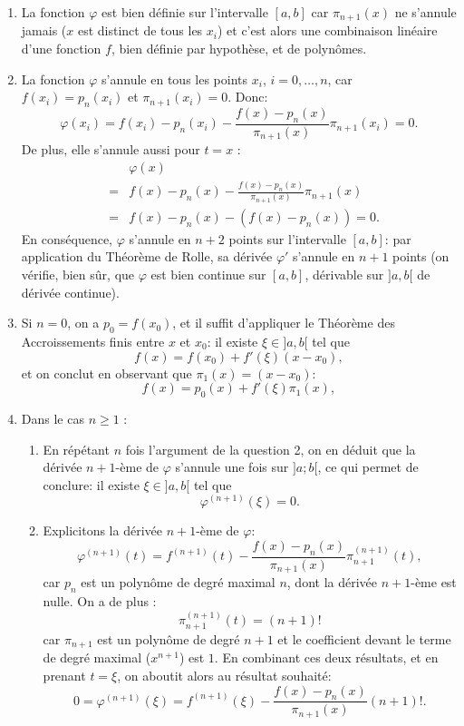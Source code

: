 \documentclass{article}
\begin{document}
\begin{enumerate}
    \item La fonction $\varphi$ est bien définie sur l'intervalle $[a,b]$ car $\pi_{n+1}(x)$ ne s'annule jamais ($x$ est distinct de tous les $x_i$) et c'est alors une combinaison linéaire d'une fonction $f$, bien définie par hypothèse, et de polynômes.
    
    \item La fonction $\varphi$ s'annule en tous les points $x_i$, $i=0,\ldots,n$, car $f(x_i)=p_n(x_i)$ et $\pi_{n+1}(x_i) = 0$. Donc:
    \[
    \varphi(x_i) = f(x_i) - p_n(x_i) - \frac{f(x)-p_n(x)}{\pi_{n+1}(x)} \pi_{n+1} (x_i) = 0.
    \]
    De plus, elle s'annule aussi pour $t=x$ :
    \begin{eqnarray*}
    && \varphi(x) \\&=& f(x) - p_n(x) - \frac{f(x)-p_n(x)}{\pi_{n+1}(x)} \pi_{n+1} (x)\\
    &=& f(x) - p_n(x) - ( f(x) - p_n(x) ) = 0.
    \end{eqnarray*}
    En conséquence, $\varphi$ s'annule en $n+2$ points sur l'intervalle $[a,b]$: par application du Théorème de Rolle, sa dérivée $\varphi'$ s'annule en $n+1$ points (on vérifie, bien sûr, que $\varphi$ est bien continue sur $[a,b]$, dérivable sur $]a,b[$ de dérivée continue).
    
    \item Si $n=0$, on a $p_0 = f(x_0)$, et il suffit d'appliquer le Théorème des Accroissements finis entre $x$ et $x_0$: il existe $\xi \in ]a,b[$ tel que 
    \[
    f(x) = f(x_0) + f'(\xi) ( x - x_0 ),
    \]
    et on conclut en observant que $\pi_1(x) = (x - x_0)$:
    \[
    f(x) = p_0(x) + f'(\xi) \pi_1(x),
    \]
    
    \item Dans le cas $n\geq1$ :
    \begin{enumerate}
        \item En répétant $n$ fois l'argument de la question 2, on en déduit que la dérivée $n+1$-ème de $\varphi$ s'annule une fois sur $]a;b[$, ce qui permet de conclure: il existe $\xi \in ]a,b[$ tel que
        \[
        \varphi^{(n+1)}(\xi) = 0.
        \]
        
        \item Explicitons la dérivée $n+1$-ème de $\varphi$:
        \[
        \varphi^{(n+1)} (t) = f^{(n+1)}(t) - \frac{f(x)-p_n(x)}{\pi_{n+1}(x)} \pi_{n+1}^{(n+1)} (t),
        \]
        car $p_n$ est un polynôme de degré maximal $n$, dont la dérivée $n+1$-ème est nulle. On a de plus :
        \[
        \pi_{n+1}^{(n+1)} (t) = (n+1)!
        \]
        car $\pi_{n+1}$ est un polynôme de degré $n+1$ et le coefficient devant le terme de degré maximal ($x^{n+1}$) est $1$.
        En combinant ces deux résultats, et en prenant $t=\xi$, on aboutit alors au résultat souhaité:
        \[
        0 = 
        \varphi^{(n+1)} (\xi) = f^{(n+1)}(\xi) - \frac{f(x)-p_n(x)}{\pi_{n+1}(x)} (n+1) !.
        \]
        

\end{enumerate}
\end{enumerate}
\end{document}
